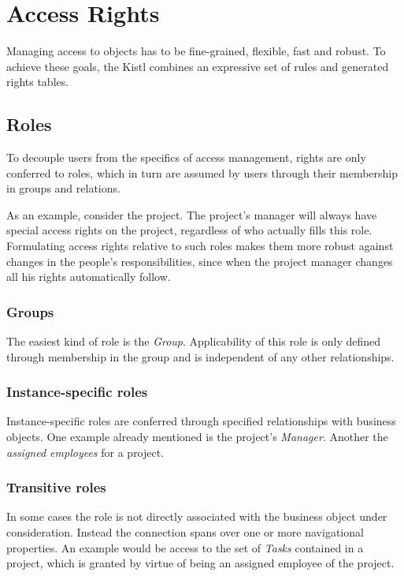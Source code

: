 \section{Access Rights}

Managing access to objects has to be fine-grained, flexible, fast and robust.
To achieve these goals, the Kistl combines an expressive set of rules and
generated rights tables.

\subsection{Roles}

To decouple users from the specifics of access management, rights are only
conferred to roles, which in turn are assumed by users through their membership
in groups and relations. 

As an example, consider the project. The project's manager will always have
special access rights on the project, regardless of who actually fills this
role. Formulating access rights relative to such roles makes them more robust
against changes in the people's responsibilities, since when the project manager
changes all his rights automatically follow.

\subsubsection{Groups}

The easiest kind of role is the \emph{Group}. Applicability of this role is only
defined through membership in the group and is independent of any other
relationships.

\subsubsection{Instance-specific roles}

Instance-specific roles are conferred through specified relationships with
business objects. One example already mentioned is the project's \emph{Manager}.
Another the \emph{assigned employees} for a project.

\subsubsection{Transitive roles}

In some cases the role is not directly associated with the business object under
consideration. Instead the connection spans over one or more navigational
properties. An example would be access to the set of \emph{Tasks} contained in a
project, which is granted by virtue of being an assigned employee of the
project.

